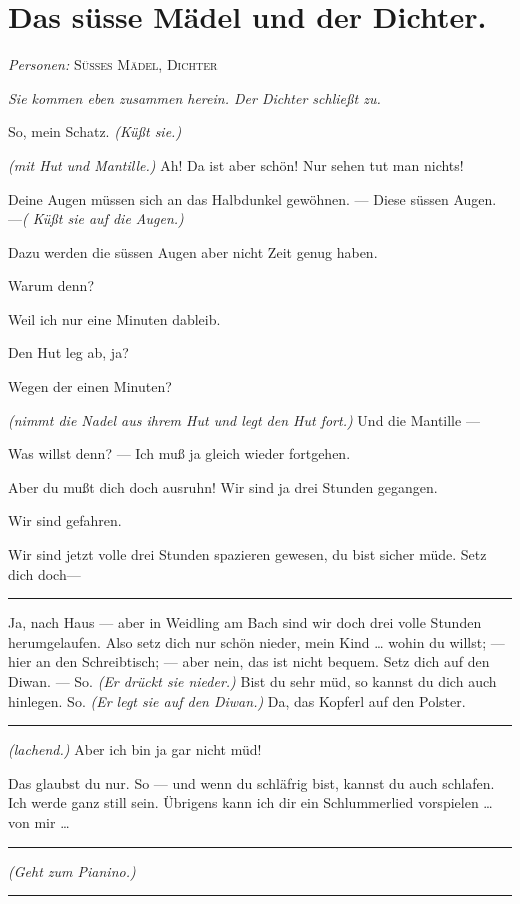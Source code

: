 \documentclass[
	final,
	a4paper,
	ngerman,
	mpinclude = true, %
	twoside = true,
	open = right,
	cleardoublepage = plain,
	DIV = 13,
	BCOR = 1cm,
	titlepage = firstiscover,
	]{scrbook}
\newcommand{\scene}{\section}
\newcommand{\direction}[1]{\textit{(#1)}}
\newcommand{\setting}[1]{\vspace{-0.5\baselineskip}\centering\textit{#1}}
\newenvironment{deletion}{%
		\vspace{0.25\baselineskip}
		\hrule
		\vspace{0.25\baselineskip}
		\color{darkgray}
	}{
		\color{black}
		\vspace{0.25\baselineskip}
		\hrule 
		\vspace{0.25\baselineskip}
	}
\newcommand{\characterlist}[1]{{\begin{center}\textit{Personen:} #1\end{center}}}
\newcommand{\thecharacter}[1]{\textup{\textsc{#1}}\xspace}
\newcommand{\thesuesse}{\thecharacter{Süßes Mädel}}
\newcommand{\thedichter}{\thecharacter{Dichter}}
\newcommand{\character}[1]{\item[#1:]}
\newcommand{\suesse}{\character{\thesuesse}}
\newcommand{\dichter}{\character{\thedichter}}
\begin{document}
\scene{Das süsse Mädel und der Dichter.}
\characterlist{\thesuesse, \thedichter}
\setting{Sie kommen eben zusammen herein. Der Dichter schließt zu.}
\begin{play}
	\dichter
	So, mein Schatz. \direction{Küßt sie.}

	\suesse
	\direction{mit Hut und Mantille.} Ah! Da ist aber schön! Nur sehen tut man nichts!

	\dichter
	Deine Augen müssen sich an das Halbdunkel gewöhnen. --- Diese süssen Augen. ---\direction{ Küßt sie auf die Augen.}

	\suesse
	Dazu werden die süssen Augen aber nicht Zeit genug haben.

	\dichter
	Warum denn?

	\suesse
	Weil ich nur eine Minuten dableib.

	\dichter
	Den Hut leg ab, ja?

	\suesse
	Wegen der einen Minuten?

	\dichter
	\direction{nimmt die Nadel aus ihrem Hut und legt den Hut fort.} Und die Mantille ---

	\suesse
	Was willst denn? --- Ich muß ja gleich wieder fortgehen.

	\dichter
	Aber du mußt dich doch ausruhn! Wir sind ja drei Stunden gegangen.

	\suesse
	Wir sind gefahren.

	\dichter
	Wir sind jetzt volle drei Stunden spazieren gewesen, du bist sicher müde. Setz dich doch---
	\begin{deletion}
		Ja, nach Haus --- aber in Weidling am Bach sind wir doch drei volle Stunden herumgelaufen. Also setz dich nur schön nieder, mein Kind \ldots{} wohin du willst;
		--- hier an den Schreibtisch; --- aber nein, das ist nicht bequem. Setz dich auf den Diwan. --- So. \direction{Er drückt sie nieder.} Bist du sehr müd, so kannst du dich auch hinlegen. So. \direction{Er legt sie auf den Diwan.} Da, das Kopferl auf den Polster.
	\end{deletion}

	\suesse
	\direction{lachend.} Aber ich bin ja gar nicht müd!

	\dichter
	Das glaubst du nur. So --- und wenn du schläfrig bist, kannst du auch schlafen. Ich werde ganz still sein. Übrigens kann ich dir ein Schlummerlied vorspielen \ldots{} von mir \ldots{}
	\begin{deletion}
		\direction{Geht zum Pianino.}
	\end{deletion}


\end{play}
\end{document}
